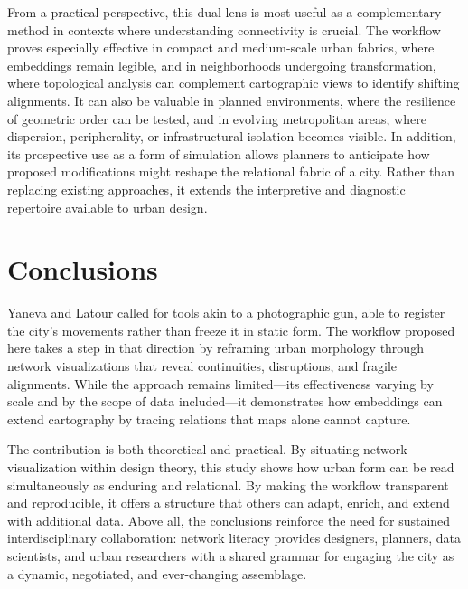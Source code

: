 \documentclass[land,article,accept,pdftex,oneauthor]{Definitions/mdpi}
\begin{document}
{From a practical perspective, this dual lens is most useful as a complementary method in contexts where understanding connectivity is crucial. The workflow proves especially effective in compact and medium-scale urban fabrics, where embeddings remain legible, and in neighborhoods undergoing transformation, where topological analysis can complement cartographic views to identify shifting alignments. It can also be valuable in planned environments, where the resilience of geometric order can be tested, and in evolving metropolitan areas, where dispersion, peripherality, or infrastructural isolation becomes visible. In addition, its prospective use as a form of simulation allows planners to anticipate how proposed modifications might reshape the relational fabric of a city. Rather than replacing existing approaches, it extends the interpretive and diagnostic repertoire available to urban design.


\section{Conclusions}\label{sec6}

Yaneva and Latour called for tools akin to a photographic gun, able to register the city’s movements rather than freeze it in static form. The workflow proposed here takes a step in that direction by reframing urban morphology through network visualizations that reveal continuities, disruptions, and fragile alignments. While the approach remains limited---its effectiveness varying by scale and by the scope of data included---it demonstrates how embeddings can extend cartography by tracing relations that maps alone cannot capture.

The contribution is both theoretical and practical. By situating network visualization within design theory, this study shows how urban form can be read simultaneously as enduring and relational. By making the workflow transparent and reproducible, it offers a structure that others can adapt, enrich, and extend with additional data. Above all, the conclusions reinforce the need for sustained interdisciplinary collaboration: network literacy provides designers, planners, data scientists, and urban researchers with a shared grammar for engaging the city as a dynamic, negotiated, and ever-changing assemblage.


}
\end{document}
